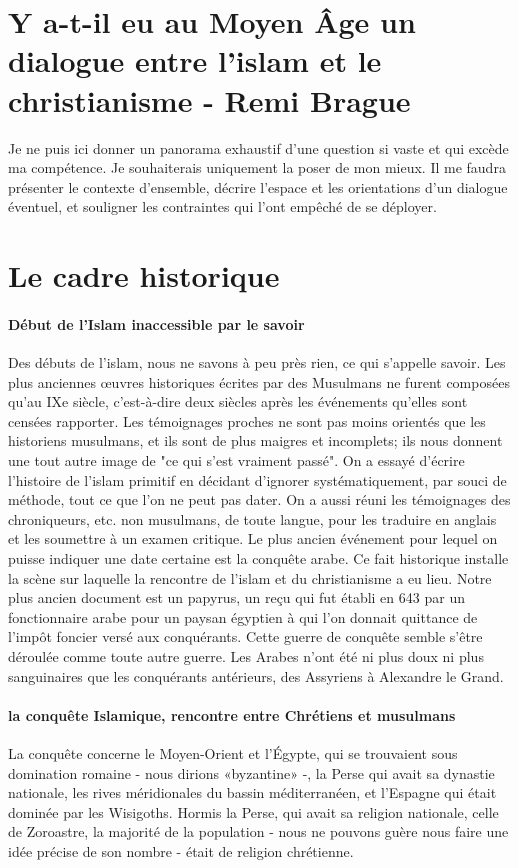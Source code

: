 

\section{Y a-t-il eu au Moyen Âge un dialogue entre l’islam et le christianisme  - Remi Brague}

Je ne puis ici donner un panorama exhaustif d'une question si vaste et qui excède ma compétence. Je souhaiterais uniquement la poser de mon mieux. Il me faudra présenter le contexte d'ensemble, décrire l'espace et les orientations d'un dialogue éventuel, et souligner les contraintes qui l'ont empêché de se déployer.

\section{Le cadre historique}

\paragraph{Début de l'Islam inaccessible par le savoir}
Des débuts de l'islam, nous ne savons à peu près rien, ce qui s'appelle savoir. Les plus anciennes œuvres historiques écrites par des Musulmans ne furent composées qu'au IXe siècle, c'est-à-dire deux siècles après les événements qu'elles sont censées rapporter. Les témoignages proches ne sont pas moins orientés que les historiens musulmans, et ils sont de plus maigres et incomplets; ils nous donnent une tout autre image de "ce qui s'est vraiment passé". On a essayé d'écrire l'histoire de l'islam primitif en décidant d'ignorer systématiquement, par souci de méthode, tout ce que l'on ne peut pas dater. 
On a aussi réuni les témoignages des chroniqueurs, etc. non musulmans, de toute langue, pour les traduire en anglais et les soumettre à un examen critique.
Le plus ancien événement pour lequel on puisse indiquer une date certaine est la conquête arabe. Ce fait historique installe la scène sur laquelle la rencontre de l'islam et du christianisme a eu lieu. Notre plus ancien document est un papyrus, un reçu qui fut établi en 643 par un fonctionnaire arabe pour un paysan égyptien à qui l'on donnait quittance de l'impôt foncier versé aux conquérants. Cette guerre de conquête semble s'être déroulée comme toute autre guerre. Les Arabes n'ont été ni plus doux ni plus sanguinaires que les conquérants antérieurs, des Assyriens à Alexandre le Grand.

\paragraph{la conquête Islamique, rencontre entre Chrétiens et musulmans}
La conquête concerne le Moyen-Orient et l'Égypte, qui se trouvaient sous domination romaine - nous dirions «byzantine» -, la Perse qui avait sa dynastie nationale, les rives méridionales du bassin méditerranéen, et l'Espagne qui était dominée par les Wisigoths. Hormis la Perse, qui avait sa religion nationale, celle de Zoroastre, la majorité de la population - nous ne pouvons guère nous faire une idée précise de son nombre - était de religion chrétienne.
